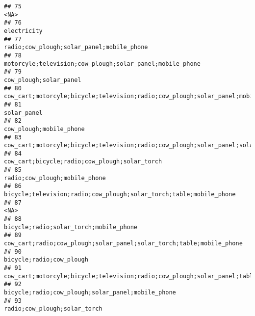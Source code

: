 \documentclass[
]{article}
\begin{document}
\begin{verbatim}
## 75                                                                                                                                      <NA>
## 76                                                                                                                               electricity
## 77                                                                                                 radio;cow_plough;solar_panel;mobile_phone
## 78                                                                                  motorcyle;television;cow_plough;solar_panel;mobile_phone
## 79                                                                                                                    cow_plough;solar_panel
## 80                                                           cow_cart;motorcyle;bicycle;television;radio;cow_plough;solar_panel;mobile_phone
## 81                                                                                                                               solar_panel
## 82                                                                                                                   cow_plough;mobile_phone
## 83                                               cow_cart;motorcyle;bicycle;television;radio;cow_plough;solar_panel;solar_torch;mobile_phone
## 84                                                                                             cow_cart;bicycle;radio;cow_plough;solar_torch
## 85                                                                                                             radio;cow_plough;mobile_phone
## 86                                                                        bicycle;television;radio;cow_plough;solar_torch;table;mobile_phone
## 87                                                                                                                                      <NA>
## 88                                                                                                    bicycle;radio;solar_torch;mobile_phone
## 89                                                                      cow_cart;radio;cow_plough;solar_panel;solar_torch;table;mobile_phone
## 90                                                                                                                  bicycle;radio;cow_plough
## 91                                                     cow_cart;motorcyle;bicycle;television;radio;cow_plough;solar_panel;table;mobile_phone
## 92                                                                                         bicycle;radio;cow_plough;solar_panel;mobile_phone
## 93                                                                                                              radio;cow_plough;solar_torch

\end{verbatim}
\end{document}
